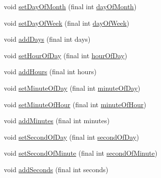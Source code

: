 \begin{DoxyCompactItemize}
void \hyperlink{classorg_1_1joda_1_1time_1_1_mutable_date_time_ab181d72b5863b02b4191240d7c0716c6}{set\-Day\-Of\-Month} (final int \hyperlink{classorg_1_1joda_1_1time_1_1_mutable_date_time_a856f4c6ce8050846d320a4b88d7adcf4}{day\-Of\-Month})
\item 
void \hyperlink{classorg_1_1joda_1_1time_1_1_mutable_date_time_a60bc5c561328a984a6108e64044162b4}{set\-Day\-Of\-Week} (final int \hyperlink{classorg_1_1joda_1_1time_1_1_mutable_date_time_a8b69adfadb5b674ef2f21af20651e796}{day\-Of\-Week})
\item 
void \hyperlink{classorg_1_1joda_1_1time_1_1_mutable_date_time_a9bc518bff43b9ba30316d116a4c94540}{add\-Days} (final int days)
\item 
void \hyperlink{classorg_1_1joda_1_1time_1_1_mutable_date_time_a3aa5fad7a20ff7f3de3ff4e62aae2967}{set\-Hour\-Of\-Day} (final int \hyperlink{classorg_1_1joda_1_1time_1_1_mutable_date_time_a3bfaaca097843a8d526d12c03e1b53e2}{hour\-Of\-Day})
\item 
void \hyperlink{classorg_1_1joda_1_1time_1_1_mutable_date_time_a50b81ca966c4f33ab4ca7dcc77ad9b9b}{add\-Hours} (final int hours)
\item 
void \hyperlink{classorg_1_1joda_1_1time_1_1_mutable_date_time_aa599efa7eef70962fa288e94adac9087}{set\-Minute\-Of\-Day} (final int \hyperlink{classorg_1_1joda_1_1time_1_1_mutable_date_time_a8bb6999ada09f3cc1c10fc4a3c4c7327}{minute\-Of\-Day})
\item 
void \hyperlink{classorg_1_1joda_1_1time_1_1_mutable_date_time_aaebc0aeb87914fb1888efab07fc6aa82}{set\-Minute\-Of\-Hour} (final int \hyperlink{classorg_1_1joda_1_1time_1_1_mutable_date_time_a30eda212c65711fde6149019836caebb}{minute\-Of\-Hour})
\item 
void \hyperlink{classorg_1_1joda_1_1time_1_1_mutable_date_time_a851d6856a089037977c83b61ae4571f1}{add\-Minutes} (final int minutes)
\item 
void \hyperlink{classorg_1_1joda_1_1time_1_1_mutable_date_time_a0ae8bbbdd03de8b849606bdb48e1390a}{set\-Second\-Of\-Day} (final int \hyperlink{classorg_1_1joda_1_1time_1_1_mutable_date_time_a5a012f1d02e5213058f50a767aeec515}{second\-Of\-Day})
\item 
void \hyperlink{classorg_1_1joda_1_1time_1_1_mutable_date_time_a3b5a34ee9893f1c4f2dc7cd281d475cb}{set\-Second\-Of\-Minute} (final int \hyperlink{classorg_1_1joda_1_1time_1_1_mutable_date_time_a2b00888de5a6e8cab5662bfe0ae4e9a9}{second\-Of\-Minute})
\item 
void \hyperlink{classorg_1_1joda_1_1time_1_1_mutable_date_time_a4124ea1e403a1620336ae226497826f9}{add\-Seconds} (final int seconds)

\end{DoxyCompactItemize}
